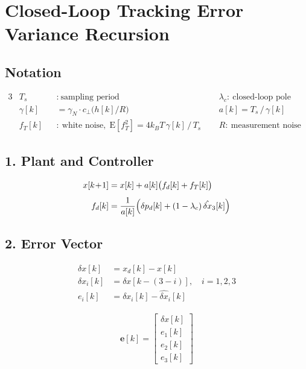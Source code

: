 \documentclass[11pt]{article}
\begin{document}
\section*{Closed-Loop Tracking Error Variance Recursion}

\subsection*{Notation}

\begin{alignat*}{3}
&T_s &&:\ \text{sampling period} &\qquad
&\lambda_c:\ \text{closed-loop pole} \\
&\gamma[k] &&= \gamma_N \cdot c_\perp\!\bigl(h[k]/R\bigr) &\qquad
&a[k] = T_s\,/\,\gamma[k] \\
&f_T[k] &&:\ \text{white noise},\;
\mathrm{E}[f_T^2] = 4k_BT\,\gamma[k]\,/\,T_s &\qquad
&R:\ \text{measurement noise variance}
\end{alignat*}

\subsection*{1. Plant and Controller}

\begin{align}
x[k\!+\!1] &= x[k] + a[k]\bigl(f_d[k] + f_T[k]\bigr) \\[4pt]
f_d[k] &= \frac{1}{a[k]}\Bigl(\delta p_d[k]
+ (1-\lambda_c)\,\hat{\delta x}_3[k]\Bigr)
\end{align}

\subsection*{2. Error Vector}

\begin{align}
\delta x[k] &= x_d[k] - x[k] \\[2pt]
\delta x_i[k] &= \delta x[k\!-\!(3\!-\!i)],\quad i=1,2,3 \\[2pt]
e_i[k] &= \delta x_i[k] - \hat{\delta x}_i[k]
\end{align}

\begin{align}
\mathbf{e}[k] = \begin{bmatrix}
\delta x[k] \\ e_1[k] \\ e_2[k] \\ e_3[k]
\end{bmatrix}
\end{align}
\end{document}
